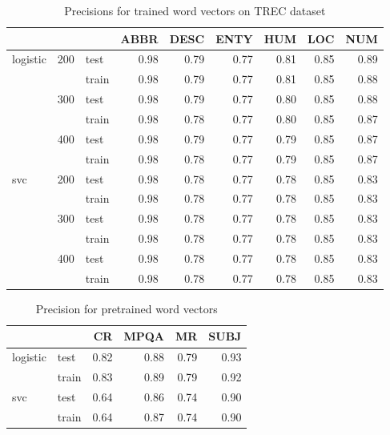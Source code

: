 \begin{table}[h]
\begin{center}

\begin{tabular}{lllrrrrrr}
\toprule
 & &&ABBR &DESC &ENTY &HUM &LOC &NUM \\
\midrule
logistic & 200 & test &0.98 &0.79 &0.77 & 0.81 & 0.85 & 0.89 \\
 & & train &0.98 &0.79 &0.77 & 0.81 & 0.85 & 0.88 \\
 & 300 & test &0.98 &0.79 &0.77 & 0.80 & 0.85 & 0.88 \\
 & & train &0.98 &0.78 &0.77 & 0.80 & 0.85 & 0.87 \\
 & 400 & test &0.98 &0.79 &0.77 & 0.79 & 0.85 & 0.87 \\
 & & train &0.98 &0.78 &0.77 & 0.79 & 0.85 & 0.87 \\
svc & 200 & test &0.98 &0.78 &0.77 & 0.78 & 0.85 & 0.83 \\
 & & train &0.98 &0.78 &0.77 & 0.78 & 0.85 & 0.83 \\
 & 300 & test &0.98 &0.78 &0.77 & 0.78 & 0.85 & 0.83 \\
 & & train &0.98 &0.78 &0.77 & 0.78 & 0.85 & 0.83 \\
 & 400 & test &0.98 &0.78 &0.77 & 0.78 & 0.85 & 0.83 \\
 & & train &0.98 &0.78 &0.77 & 0.78 & 0.85 & 0.83 \\
\bottomrule
\end{tabular}

\caption[Precisions for trained word vectors on TREC dataset]{Precisions for trained word vectors on TREC dataset}
\label{tab:res:trainedwordvec:trec}
\end{center}
\end{table}



\begin{table}[h]
\begin{center}

\begin{tabular}{llrrrr}
\toprule
 &&CR &MPQA &MR &SUBJ \\
\midrule
logistic & test & 0.82 & 0.88 & 0.79 & 0.93 \\
 & train & 0.83 & 0.89 & 0.79 & 0.92 \\
svc & test & 0.64 & 0.86 & 0.74 & 0.90 \\
 & train & 0.64 & 0.87 & 0.74 & 0.90 \\
\bottomrule
\end{tabular}

\caption[Precision for pretrained word vectors]{Precision for pretrained word vectors}
\label{tab:}
\end{center}
\end{table}



